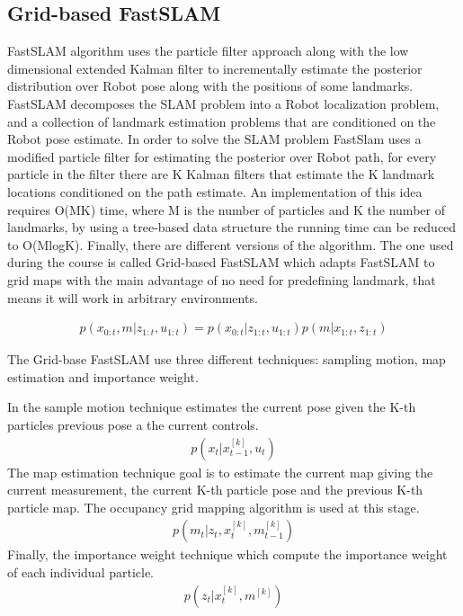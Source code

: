 \documentclass[10pt,journal,compsoc]{IEEEtran}
\begin{document}
\subsection{Grid-based FastSLAM}
FastSLAM algorithm uses the particle filter approach along with the low dimensional extended Kalman filter to incrementally estimate the posterior distribution over Robot pose along with the positions of some landmarks. FastSLAM decomposes the SLAM problem into a Robot localization problem, and a collection of landmark estimation problems that are conditioned on the Robot pose estimate. In order to solve the SLAM problem FastSlam uses a modified particle filter for estimating the posterior over Robot path, for every particle in the filter there are K Kalman filters that estimate the K landmark locations conditioned on the path estimate. An implementation of this idea requires {O(MK)} time, where M is the number of particles and K the number of landmarks, by using a tree-based data structure the running time can be reduced to {O(MlogK)}. Finally, there are different versions of the algorithm. The one used during the course is called Grid-based FastSLAM which adapts FastSLAM to grid maps with the main advantage of no need for predefining landmark, that means it will work in arbitrary environments.

\begin{align}
p(x_{0:t},m|z_{1:t},u_{1:t})=p(x_{0:t}|z_{1:t},u_{1:t})p(m|x_{1:t},z_{1:t})
\end{align}

The Grid-base FastSLAM use three different techniques: sampling motion, map estimation and importance weight.

In the sample motion technique estimates the current pose given the K-th particles previous pose a the current controls.
\begin{align}
p(x_{t}|x_{t-1}^{[k]},u_{t})
\end{align}
The map estimation technique goal is to estimate the current map giving the current measurement, the current K-th particle pose and the previous K-th particle map. The occupancy grid mapping algorithm is used at this stage.
\begin{align}
p(m_{t}|z_{t},x_{t}^{[k]},m_{t-1}^{[k]})
\end{align}
Finally, the importance weight technique which compute the importance weight of each individual particle.
\begin{align}
p(z_{t}|x_{t}^{[k]},m^{[k]})
\end{align}
\end{document}
